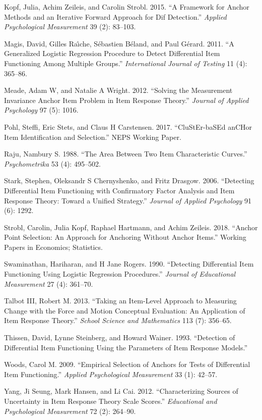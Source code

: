 \documentclass[
  11pt,
]{article}
\begin{document}
\leavevmode\hypertarget{ref-kopf2015framework}{}%
Kopf, Julia, Achim Zeileis, and Carolin Strobl. 2015. ``A Framework for Anchor Methods and an Iterative Forward Approach for Dif Detection.'' \emph{Applied Psychological Measurement} 39 (2): 83--103.

\leavevmode\hypertarget{ref-magis2011generalized}{}%
Magis, David, Gilles Raı̂che, Sébastien Béland, and Paul Gérard. 2011. ``A Generalized Logistic Regression Procedure to Detect Differential Item Functioning Among Multiple Groups.'' \emph{International Journal of Testing} 11 (4): 365--86.

\leavevmode\hypertarget{ref-meade2012solving}{}%
Meade, Adam W, and Natalie A Wright. 2012. ``Solving the Measurement Invariance Anchor Item Problem in Item Response Theory.'' \emph{Journal of Applied Psychology} 97 (5): 1016.

\leavevmode\hypertarget{ref-pohl2017cluster}{}%
Pohl, Steffi, Eric Stets, and Claus H Carstensen. 2017. ``CluStEr-baSEd anCHor Item Identification and Selection.'' NEPS Working Paper.

\leavevmode\hypertarget{ref-raju1988area}{}%
Raju, Nambury S. 1988. ``The Area Between Two Item Characteristic Curves.'' \emph{Psychometrika} 53 (4): 495--502.

\leavevmode\hypertarget{ref-stark2006detecting}{}%
Stark, Stephen, Oleksandr S Chernyshenko, and Fritz Drasgow. 2006. ``Detecting Differential Item Functioning with Confirmatory Factor Analysis and Item Response Theory: Toward a Unified Strategy.'' \emph{Journal of Applied Psychology} 91 (6): 1292.

\leavevmode\hypertarget{ref-strobl2018anchor}{}%
Strobl, Carolin, Julia Kopf, Raphael Hartmann, and Achim Zeileis. 2018. ``Anchor Point Selection: An Approach for Anchoring Without Anchor Items.'' Working Papers in Economics; Statistics.

\leavevmode\hypertarget{ref-swaminathan1990detecting}{}%
Swaminathan, Hariharan, and H Jane Rogers. 1990. ``Detecting Differential Item Functioning Using Logistic Regression Procedures.'' \emph{Journal of Educational Measurement} 27 (4): 361--70.

\leavevmode\hypertarget{ref-talbot2013taking}{}%
Talbot III, Robert M. 2013. ``Taking an Item-Level Approach to Measuring Change with the Force and Motion Conceptual Evaluation: An Application of Item Response Theory.'' \emph{School Science and Mathematics} 113 (7): 356--65.

\leavevmode\hypertarget{ref-thissen1993detection}{}%
Thissen, David, Lynne Steinberg, and Howard Wainer. 1993. ``Detection of Differential Item Functioning Using the Parameters of Item Response Models.''

\leavevmode\hypertarget{ref-woods2009empirical}{}%
Woods, Carol M. 2009. ``Empirical Selection of Anchors for Tests of Differential Item Functioning.'' \emph{Applied Psychological Measurement} 33 (1): 42--57.

\leavevmode\hypertarget{ref-yang2012characterizing}{}%
Yang, Ji Seung, Mark Hansen, and Li Cai. 2012. ``Characterizing Sources of Uncertainty in Item Response Theory Scale Scores.'' \emph{Educational and Psychological Measurement} 72 (2): 264--90.
\end{document}
